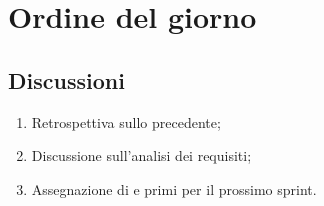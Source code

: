 \section{Ordine del giorno} \label{sec:agenda}
\subsection{Discussioni} \label{subsec:discussione}
\begin{enumerate}
    \item Retrospettiva sullo  precedente;
    \item Discussione sull'analisi dei  requisiti;
    \item Assegnazione di  e primi  per il prossimo sprint.
\end{enumerate}
